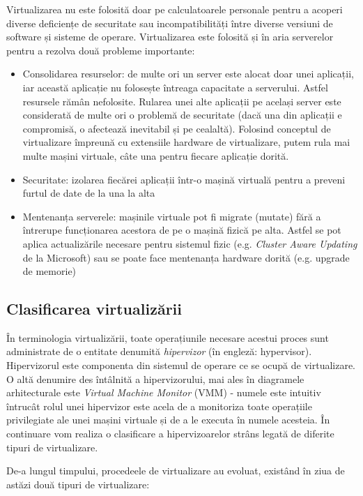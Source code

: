 Virtualizarea nu este folosită doar pe calculatoarele personale pentru a acoperi
diverse deficiențe de securitate sau incompatibilități între diverse versiuni de
software și sisteme de operare. Virtualizarea este folosită și în aria
serverelor pentru a rezolva două probleme importante:

\begin{itemize}
	\item Consolidarea resurselor: de multe ori un server este alocat doar
		unei aplicații, iar această aplicație nu folosește întreaga
		capacitate a serverului. Astfel resursele rămân nefolosite.
		Rularea unei alte aplicații pe același server este considerată
		de multe ori o problemă de securitate (dacă una din aplicații e
		compromisă, o afectează inevitabil și pe cealaltă). Folosind
		conceptul de virtualizare împreună cu extensiile hardware de
		virtualizare, putem rula mai multe mașini virtuale, câte una
		pentru fiecare aplicație dorită.
	\item Securitate: izolarea fiecărei aplicații într-o mașină virtuală
		pentru a preveni furtul de date de la una la alta
	\item Mentenanța serverele: mașinile virtuale pot fi migrate (mutate)
		fără a întrerupe funcționarea acestora de pe o mașină fizică pe
		alta. Astfel se pot aplica actualizările necesare pentru
		sistemul fizic (e.g. \textit{Cluster Aware Updating} de la
		Microsoft) sau se poate face mentenanța hardware dorită (e.g.
		upgrade de memorie)
\end{itemize}

\subsection{Clasificarea virtualizării}
\label{sec:vm-intro-class}

În terminologia virtualizării, toate operațiunile necesare acestui proces sunt
administrate de o entitate denumită \textit{hipervizor} (în engleză:
hypervisor). Hipervizorul este componenta din sistemul de operare ce se ocupă
de virtualizare. O altă denumire des întâlnită a hipervizorului, mai ales în
diagramele arhitecturale este \textit{Virtual Machine Monitor} (VMM) - numele
este intuitiv întrucât rolul unei hipervizor este acela de a monitoriza toate
operațiile privilegiate ale unei mașini virtuale și de a le executa în numele
acesteia. În continuare vom realiza o clasificare a hipervizoarelor strâns
legată de diferite tipuri de virtualizare.

De-a lungul timpului, procedeele de virtualizare au evoluat, existând în ziua de
astăzi două tipuri de virtualizare:

